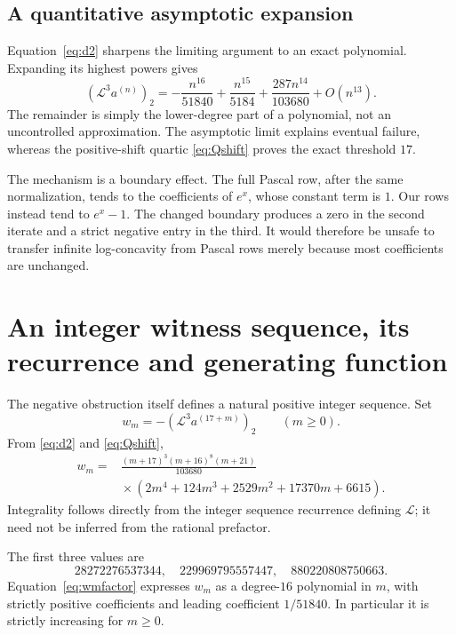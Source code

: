 \documentclass[11pt,a4paper]{article}
\theoremstyle{definition}
\newcommand{\Lop}{\mathcal L}
\newcommand{\aco}{a^{(n)}}
\begin{document}
\subsection{A quantitative asymptotic expansion}
Equation~\eqref{eq:d2} sharpens the limiting argument to an exact
polynomial. Expanding its highest powers gives
\begin{equation}\label{eq:asymptotic}
 (\Lop^3\aco)_2
 =-\frac{n^{16}}{51840}
   +\frac{n^{15}}{5184}
   +\frac{287n^{14}}{103680}
   +O(n^{13}).
\end{equation}
The remainder is simply the lower-degree part of a polynomial, not an
uncontrolled approximation. The asymptotic limit explains eventual
failure, whereas the positive-shift quartic \eqref{eq:Qshift} proves the
exact threshold $17$.

The mechanism is a boundary effect. The full Pascal row, after the same
normalization, tends to the coefficients of $e^x$, whose constant term
is $1$. Our rows instead tend to $e^x-1$. The changed boundary produces a
zero in the second iterate and a strict negative entry in the third.
It would therefore be unsafe to transfer infinite log-concavity from
Pascal rows merely because most coefficients are unchanged.

\section{An integer witness sequence, its recurrence and generating function}
\label{sec:witnesssequence}

The negative obstruction itself defines a natural positive integer
sequence. Set
\begin{equation}\label{eq:wm}
 w_m=-(\Lop^3a^{(17+m)})_2\qquad(m\ge0).
\end{equation}
From \eqref{eq:d2} and \eqref{eq:Qshift},
\begin{equation}\label{eq:wmfactor}
 \begin{split}
 w_m={}&\frac{(m+17)^3(m+16)^8(m+21)}{103680}\\
 &\mathrel{}\times
 (2m^4+124m^3+2529m^2+17370m+6615).
 \end{split}
\end{equation}
Integrality follows directly from the integer sequence recurrence defining
$\Lop$; it need not be inferred from the rational prefactor.

The first three values are
\[
 28272276537344,\quad229969795557447,\quad880220808750663.
\]
Equation~\eqref{eq:wmfactor} expresses $w_m$ as a degree-$16$ polynomial
in $m$, with strictly positive coefficients and leading coefficient
$1/51840$. In particular it is strictly increasing for $m\ge0$.
\end{document}
